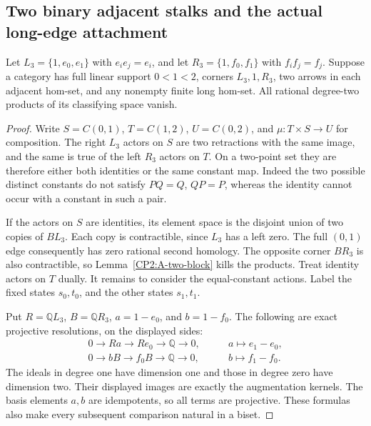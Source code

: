 \subsection{Two binary adjacent stalks and the actual long-edge attachment}

\begin{theorem}
\label{CP2:A-binary-adjacent-opposite-three-bands}
Let $L_3=\{1,e_0,e_1\}$ with $e_i e_j=e_i$, and let
$R_3=\{1,f_0,f_1\}$ with $f_i f_j=f_j$.
Suppose a category has full linear support $0<1<2$, corners
$L_3,1,R_3$, two arrows in each adjacent hom-set, and any
nonempty finite long hom-set. All rational degree-two products
of its classifying space vanish.
\end{theorem}
\begin{proof}
Write $S=C(0,1)$, $T=C(1,2)$, $U=C(0,2)$, and
$\mu:T\times S\to U$ for composition. The right $L_3$ actors
on $S$ are two retractions with the same image, and the same is
true of the left $R_3$ actors on $T$. On a two-point set they
are therefore either both identities or the same constant map.
Indeed the two possible distinct constants do not satisfy
$PQ=Q$, $QP=P$, whereas the identity cannot occur with a
constant in such a pair.

If the actors on $S$ are identities, its element space is the
disjoint union of two copies of $BL_3$. Each copy is contractible,
since $L_3$ has a left zero. The full $(0,1)$ edge consequently
has zero rational second homology. The opposite corner $BR_3$
is also contractible, so Lemma~\ref{CP2:A-two-block} kills
the products. Treat identity actors on $T$ dually. It remains
to consider the equal-constant actions. Label the fixed states
$s_0,t_0$, and the other states $s_1,t_1$.

Put $R=\mathbb QL_3$, $B=\mathbb QR_3$,
$a=1-e_0$, and $b=1-f_0$. The following are exact projective
resolutions, on the displayed sides:
\[
\begin{split}
 0\longrightarrow Ra\longrightarrow Re_0
   \longrightarrow\mathbb Q\longrightarrow0,
 &\qquad a\longmapsto e_1-e_0,\\
 0\longrightarrow bB\longrightarrow f_0B
   \longrightarrow\mathbb Q\longrightarrow0,
 &\qquad b\longmapsto f_1-f_0.
\end{split}
\]
The ideals in degree one have dimension one and those in
degree zero have dimension two. Their displayed images are
exactly the augmentation kernels. The basis elements $a,b$
are idempotents, so all terms are projective. These formulas
also make every subsequent comparison natural in a biset.


\end{proof}
